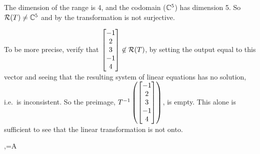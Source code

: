 {}
%
{The dimension of the range is 4, and the codomain (${\mathbb C}\sp{5}$) has dimension 5.  So $\mathcal{R}\!\protect\left(T\protect\right)\neq{\mathbb C}\sp{5}$ and by  the transformation is not surjective.\par
%
To be more precise, verify that $\begin{bmatrix}-1\\2\\3\\-1\\4\end{bmatrix}\not\in\mathcal{R}\!\protect\left(T\protect\right)$, by setting the output equal to this vector and seeing that the resulting system of linear equations has no solution, i.e.\ is inconsistent.  So the preimage, $T\sp{-1}\protect\left(\begin{bmatrix}-1\\2\\3\\-1\\4\end{bmatrix}\protect\right)$, is empty.  This alone is sufficient to see that the linear transformation is not onto.
}
%
%
%
\ltmatrixrepresentation
{,\quad{}=A}
{}
%
%
